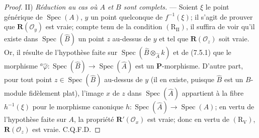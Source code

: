 \begin{proof}
II) \emph{Réduction au cas où $A$ et $B$ sont complets.} --- Soient $\xi$
le point générique de $\operatorname{Spec}(A)$, $y$ un point quelconque de
$f^{-1}(\xi)$; il s'agit de prouver que
$\boldsymbol R(\mathscr O_y)$ est vraie; compte tenu de la condition
$(\mathrm R_{\mathrm{II}})$, il suffira de voir qu'il existe dans
$\operatorname{Spec}(\widehat B)$ un point $z$ au-dessus de $y$ et tel que
$\boldsymbol R(\mathscr O_z)$ soit vraie. Or, il résulte de l'hypothèse
faite sur $\operatorname{Spec}(\widehat B\otimes_{\widehat A}k)$ et de
(7.5.1) que le morphisme
${}^a\widehat\varphi:\operatorname{Spec}(\widehat B)
\to\operatorname{Spec}(\widehat A)$
est un $\boldsymbol P$-morphisme. D'autre part, pour tout point
$z\in\operatorname{Spec}(\widehat B)$ au-dessus de $y$ (il en existe,
puisque $\widehat B$ est un $B$-module fidèlement plat), l'image $x$ de $z$
dans $\operatorname{Spec}(\widehat A)$ appartient à la fibre
$h^{-1}(\xi)$ pour le morphisme canonique
$h:\operatorname{Spec}(\widehat A)\to\operatorname{Spec}(A)$; en vertu de
l'hypothèse faite sur $A$, la propriété
$\boldsymbol R'(\mathscr O_x)$ est vraie; donc en vertu de
$(\mathrm R_{\mathrm V})$, $\boldsymbol R(\mathscr O_z)$ est vraie.
C.Q.F.D.
\end{proof}

